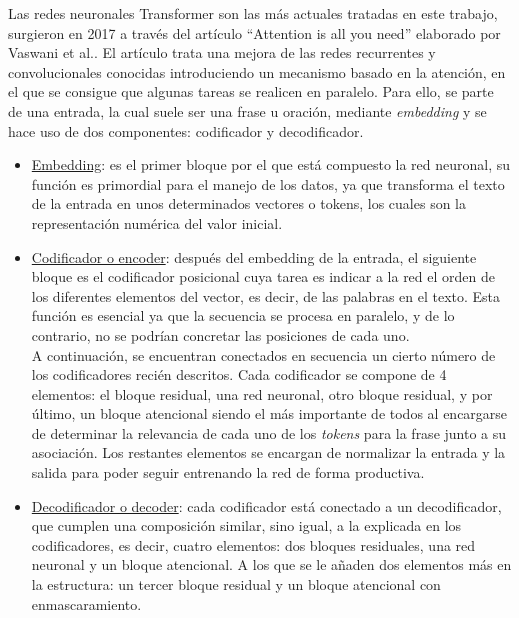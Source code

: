Las redes neuronales Transformer son las más actuales tratadas en este trabajo, surgieron en 2017 a través del artículo “Attention is all you need” elaborado por Vaswani et al.. El artículo trata una mejora de las redes recurrentes y convolucionales conocidas introduciendo un mecanismo basado en la atención, en el que se consigue que algunas tareas se realicen en paralelo. Para ello, se parte de una entrada, la cual suele ser una frase u oración, mediante \textit{embedding} y se hace uso de dos componentes: codificador y decodificador. \\
\begin{itemize}
	\item \underline{Embedding}: es el primer bloque por el que está compuesto la red neuronal, su función es primordial para el manejo de los datos, ya que transforma el texto de la entrada en unos determinados vectores o tokens, los cuales son la representación numérica del valor inicial. \\
	\item \underline{Codificador o encoder}:  después del embedding de la entrada, el siguiente bloque es el codificador posicional cuya tarea es indicar a la red el orden de los diferentes elementos del vector, es decir, de las palabras en el texto. Esta función es esencial ya que la secuencia se procesa en paralelo, y de lo contrario, no se podrían concretar las posiciones de cada uno.\\
	
	A continuación, se encuentran conectados en secuencia un cierto número de los codificadores recién descritos. Cada codificador se compone de 4 elementos: el bloque residual, una red neuronal, otro bloque residual, y por último, un bloque atencional siendo el más importante de todos al encargarse de determinar la relevancia de cada uno de los \textit{tokens} para la frase junto a su asociación. Los restantes elementos se encargan de normalizar la entrada y la salida para poder seguir entrenando la red de forma productiva. \\
	\item 
	\underline{Decodificador o decoder}: cada codificador está conectado a un decodificador, que cumplen una composición similar, sino igual,  a  la explicada en los codificadores, es decir, cuatro elementos: dos bloques residuales, una red neuronal y un bloque atencional. A los que se le añaden dos elementos más en la estructura: un tercer bloque residual y un bloque atencional con enmascaramiento. \\
	

\end{itemize}

